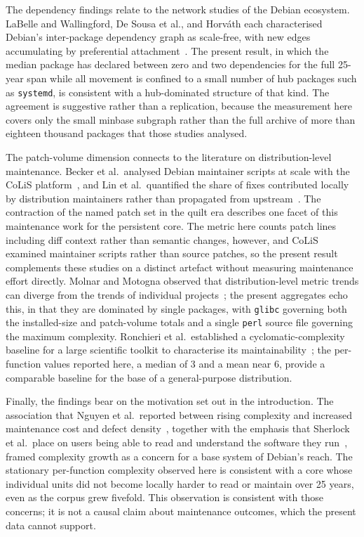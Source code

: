 The dependency findings relate to the network studies of the Debian ecosystem. LaBelle and Wallingford, De Sousa et al., and Horváth each characterised Debian's inter-package dependency graph as scale-free, with new edges accumulating by preferential attachment~\cite{interPackageDependency,sousa2009debian,horvath2012linuxdeps}. The present result, in which the median package has declared between zero and two dependencies for the full 25-year span while all movement is confined to a small number of hub packages such as \texttt{systemd}, is consistent with a hub-dominated structure of that kind. The agreement is suggestive rather than a replication, because the measurement here covers only the small minbase subgraph rather than the full archive of more than eighteen thousand packages that those studies analysed.

The patch-volume dimension connects to the literature on distribution-level maintenance. Becker et al.\ analysed Debian maintainer scripts at scale with the CoLiS platform~\cite{becker2022colis}, and Lin et al.\ quantified the share of fixes contributed locally by distribution maintainers rather than propagated from upstream~\cite{lin2022upstream,lin2023vulnerability}. The contraction of the named patch set in the quilt era describes one facet of this maintenance work for the persistent core. The metric here counts patch lines including diff context rather than semantic changes, however, and CoLiS examined maintainer scripts rather than source patches, so the present result complements these studies on a distinct artefact without measuring maintenance effort directly. Molnar and Motogna observed that distribution-level metric trends can diverge from the trends of individual projects~\cite{molnar2020longitudinal}; the present aggregates echo this, in that they are dominated by single packages, with \texttt{glibc} governing both the installed-size and patch-volume totals and a single \texttt{perl} source file governing the maximum complexity. Ronchieri et al.\ established a cyclomatic-complexity baseline for a large scientific toolkit to characterise its maintainability~\cite{ronchieri2016software}; the per-function values reported here, a median of 3 and a mean near 6, provide a comparable baseline for the base of a general-purpose distribution.

Finally, the findings bear on the motivation set out in the introduction. The association that Nguyen et al.\ reported between rising complexity and increased maintenance cost and defect density~\cite{nguyen2017impact}, together with the emphasis that Sherlock et al.\ place on users being able to read and understand the software they run~\cite{Sherlock2018OpenSS}, framed complexity growth as a concern for a base system of Debian's reach. The stationary per-function complexity observed here is consistent with a core whose individual units did not become locally harder to read or maintain over 25 years, even as the corpus grew fivefold. This observation is consistent with those concerns; it is not a causal claim about maintenance outcomes, which the present data cannot support.

